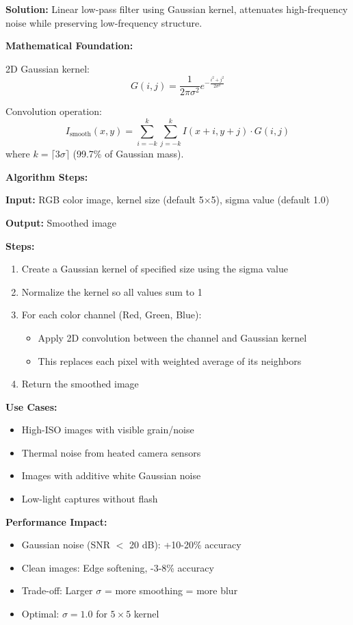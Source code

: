 \documentclass[12pt,a4paper]{article}
\begin{document}
\textbf{Solution:} Linear low-pass filter using Gaussian kernel, attenuates high-frequency noise while preserving low-frequency structure.

\textbf{Mathematical Foundation:}

2D Gaussian kernel:
\begin{equation*}
    G(i, j) = \frac{1}{2\pi\sigma^2} e^{-\frac{i^2 + j^2}{2\sigma^2}}
\end{equation*}

Convolution operation:
\begin{equation*}
    I_{\text{smooth}}(x, y) = \sum_{i=-k}^{k} \sum_{j=-k}^{k} I(x+i, y+j) \cdot G(i, j)
\end{equation*}
where $k = \lceil 3\sigma \rceil$ (99.7\% of Gaussian mass).

\textbf{Algorithm Steps:}

\textbf{Input:} RGB color image, kernel size (default 5×5), sigma value (default 1.0)

\textbf{Output:} Smoothed image

\textbf{Steps:}
\begin{enumerate}
    \item Create a Gaussian kernel of specified size using the sigma value
    \item Normalize the kernel so all values sum to 1
    \item For each color channel (Red, Green, Blue):
    \begin{itemize}
        \item Apply 2D convolution between the channel and Gaussian kernel
        \item This replaces each pixel with weighted average of its neighbors
    \end{itemize}
    \item Return the smoothed image
\end{enumerate}

\textbf{Use Cases:}
\begin{itemize}
    \item High-ISO images with visible grain/noise
    \item Thermal noise from heated camera sensors
    \item Images with additive white Gaussian noise
    \item Low-light captures without flash
\end{itemize}

\textbf{Performance Impact:}
\begin{itemize}
    \item Gaussian noise (SNR $<$ 20 dB): +10-20\% accuracy
    \item Clean images: Edge softening, -3-8\% accuracy
    \item Trade-off: Larger $\sigma$ = more smoothing = more blur
    \item Optimal: $\sigma = 1.0$ for $5 \times 5$ kernel
\end{itemize}
\end{document}
